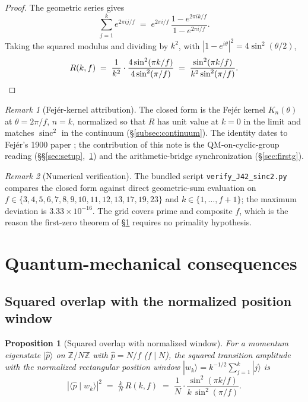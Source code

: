 \documentclass[11pt,reqno]{amsart}
\theoremstyle{plain}
\newtheorem{proposition}[theorem]{Proposition}
\theoremstyle{definition}
\theoremstyle{remark}
\newtheorem*{remark}{Remark}
\newcommand{\Z}{\mathbb{Z}}
\DeclareMathOperator{\sinc}{sinc}
\begin{document}
\begin{proof}
The geometric series gives
\[
  \sum_{j=1}^{k} e^{2\pi i j/f}
  \;=\; e^{2\pi i / f}\,\frac{1 - e^{2\pi i k/f}}{1 - e^{2\pi i/f}}.
\]
Taking the squared modulus and dividing by $k^{2}$, with
$|1 - e^{i\theta}|^{2} = 4\sin^{2}(\theta/2)$,
\[
  R(k,f) \;=\; \frac{1}{k^{2}} \cdot \frac{4\sin^{2}(\pi k/f)}{4\sin^{2}(\pi/f)}
  \;=\; \frac{\sin^{2}(\pi k/f)}{k^{2}\sin^{2}(\pi/f)}. \qedhere
\]
\end{proof}

\begin{remark}[Fej\'er-kernel attribution]
The closed form is the Fej\'er kernel $K_{n}(\theta)$ at $\theta = 2\pi/f$, $n = k$,
normalized so that $R$ has unit value at $k = 0$ in the limit and matches $\sinc^{2}$ in
the continuum (\S\ref{subsec:continuum}). The identity dates to Fej\'er's 1900 paper
\cite{Fejer1900}; the contribution of this note is the QM-on-cyclic-group reading
(\S\S\ref{sec:setup},~\ref{sec:qm}) and the arithmetic-bridge synchronization
(\S\ref{sec:firstg}).
\end{remark}

\begin{remark}[Numerical verification]
The bundled script \texttt{verify\_J42\_sinc2.py} compares the closed form against direct
geometric-sum evaluation on $f \in \{3,4,5,6,7,8,9,10,11,12,13,17,19,23\}$ and
$k \in \{1,\dots,f+1\}$; the maximum deviation is $3.33 \times 10^{-16}$. The grid covers
prime and composite $f$, which is the reason the first-zero theorem of
\S\ref{sec:qm} requires no primality hypothesis.
\end{remark}

\section{Quantum-mechanical consequences}
\label{sec:qm}

\subsection{Squared overlap with the normalized position window}

\begin{proposition}[Squared overlap with normalized window]
\label{prop:overlap}
For a momentum eigenstate $|\hat p\rangle$ on $\Z/N\Z$ with $\hat p = N/f$ ($f \mid N$),
the squared transition amplitude with the normalized rectangular position window
$|w_{k}\rangle = k^{-1/2}\sum_{j=1}^{k}|j\rangle$ is
\[
  |\langle \hat p \mid w_{k}\rangle|^{2}
  \;=\; \tfrac{k}{N}\,R(k,f)
  \;=\; \frac{1}{N} \cdot \frac{\sin^{2}(\pi k/f)}{k\,\sin^{2}(\pi/f)}.
\]
\end{proposition}
\end{document}
